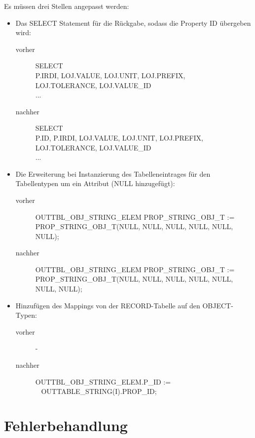Es müssen drei Stellen angepasst werden: 

\begin{itemize}
\item Das SELECT Statement für die Rückgabe, sodass die Property ID übergeben wird: 
  \begin{description}
  \item[vorher] SELECT \\
  P.IRDI, LOJ.VALUE, LOJ.UNIT,  LOJ.PREFIX, \\ 
  LOJ.TOLERANCE, LOJ.VALUE\_ID \\
  ...
  \item[nachher] SELECT \\
  P.ID, P.IRDI, LOJ.VALUE, LOJ.UNIT, LOJ.PREFIX, \\ 
  LOJ.TOLERANCE, LOJ.VALUE\_ID \\
  ...
  \end{description}
\item Die Erweiterung bei Instanzierung des Tabelleneintrages für den Tabellentypen um ein Attribut (NULL hinzugefügt): 
  \begin{description}
  \item[vorher] OUTTBL\_OBJ\_STRING\_ELEM  PROP\_STRING\_OBJ\_T :=  \\
  PROP\_STRING\_OBJ\_T(NULL, NULL, NULL, NULL, NULL, NULL);
  \item[nachher] OUTTBL\_OBJ\_STRING\_ELEM  PROP\_STRING\_OBJ\_T :=  \\
  PROP\_STRING\_OBJ\_T(NULL, NULL, NULL, NULL, NULL, NULL, NULL);
  \end{description}
\item Hinzufügen des Mappings von der RECORD-Tabelle auf den OBJECT-Typen:
  \begin{description}
  \item[vorher] -
  \item[nachher] OUTTBL\_OBJ\_STRING\_ELEM.P\_ID := \\~ 
  OUTTABLE\_STRING(I).PROP\_ID;  
  \end{description}
\end{itemize}
 
\section{Fehlerbehandlung}


